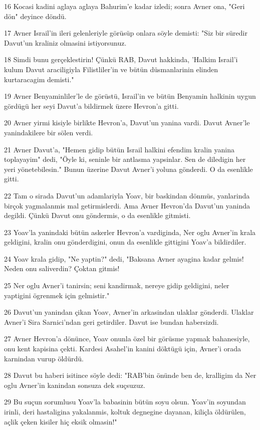 \par 16 Kocasi kadini aglaya aglaya Bahurim'e kadar izledi; sonra Avner ona, "Geri dön" deyince döndü.
\par 17 Avner Israil'in ileri gelenleriyle görüsüp onlara söyle demisti: "Siz bir süredir Davut'un kraliniz olmasini istiyorsunuz.
\par 18 Simdi bunu gerçeklestirin! Çünkü RAB, Davut hakkinda, 'Halkim Israil'i kulum Davut araciligiyla Filistliler'in ve bütün düsmanlarinin elinden kurtaracagim demisti."
\par 19 Avner Benyaminliler'le de görüstü, Israil'in ve bütün Benyamin halkinin uygun gördügü her seyi Davut'a bildirmek üzere Hevron'a gitti.
\par 20 Avner yirmi kisiyle birlikte Hevron'a, Davut'un yanina vardi. Davut Avner'le yanindakilere bir sölen verdi.
\par 21 Avner Davut'a, "Hemen gidip bütün Israil halkini efendim kralin yanina toplayayim" dedi, "Öyle ki, seninle bir antlasma yapsinlar. Sen de diledigin her yeri yönetebilesin." Bunun üzerine Davut Avner'i yoluna gönderdi. O da esenlikle gitti.
\par 22 Tam o sirada Davut'un adamlariyla Yoav, bir baskindan dönmüs, yanlarinda birçok yagmalanmis mal getirmislerdi. Ama Avner Hevron'da Davut'un yaninda degildi. Çünkü Davut onu göndermis, o da esenlikle gitmisti.
\par 23 Yoav'la yanindaki bütün askerler Hevron'a vardiginda, Ner oglu Avner'in krala geldigini, kralin onu gönderdigini, onun da esenlikle gittigini Yoav'a bildirdiler.
\par 24 Yoav krala gidip, "Ne yaptin?" dedi, "Baksana Avner ayagina kadar gelmis! Neden onu saliverdin? Çoktan gitmis!
\par 25 Ner oglu Avner'i tanirsin; seni kandirmak, nereye gidip geldigini, neler yaptigini ögrenmek için gelmistir."
\par 26 Davut'un yanindan çikan Yoav, Avner'in arkasindan ulaklar gönderdi. Ulaklar Avner'i Sira Sarnici'ndan geri getirdiler. Davut ise bundan habersizdi.
\par 27 Avner Hevron'a dönünce, Yoav onunla özel bir görüsme yapmak bahanesiyle, onu kent kapisina çekti. Kardesi Asahel'in kanini döktügü için, Avner'i orada karnindan vurup öldürdü.
\par 28 Davut bu haberi isitince söyle dedi: "RAB'bin önünde ben de, kralligim da Ner oglu Avner'in kanindan sonsuza dek suçsuzuz.
\par 29 Bu suçun sorumlusu Yoav'la babasinin bütün soyu olsun. Yoav'in soyundan irinli, deri hastaligina yakalanmis, koltuk degnegine dayanan, kiliçla öldürülen, açlik çeken kisiler hiç eksik olmasin!"
